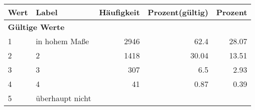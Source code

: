      \begin{longtable}{lXrrr}
     \toprule
     \textbf{Wert} & \textbf{Label} & \textbf{Häufigkeit} & \textbf{Prozent(gültig)} & \textbf{Prozent} \\
     \endhead
     \midrule
     \multicolumn{5}{l}{\textbf{Gültige Werte}}\\

     1 &
     \multicolumn{1}{X}{ in hohem Maße   } &


       \num{2946} &
       \num[round-mode=places,round-precision=2]{62.4} &
         \num[round-mode=places,round-precision=2]{28.07} \\

     2 &
     \multicolumn{1}{X}{ 2   } &


       \num{1418} &
       \num[round-mode=places,round-precision=2]{30.04} &
         \num[round-mode=places,round-precision=2]{13.51} \\

     3 &
     \multicolumn{1}{X}{ 3   } &


       \num{307} &
       \num[round-mode=places,round-precision=2]{6.5} &
         \num[round-mode=places,round-precision=2]{2.93} \\

     4 &
     \multicolumn{1}{X}{ 4   } &


       \num{41} &
       \num[round-mode=places,round-precision=2]{0.87} &
         \num[round-mode=places,round-precision=2]{0.39} \\

     5 &
     \multicolumn{1}{X}{ überhaupt nicht   } &



\end{longtable}
